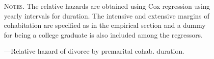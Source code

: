 \documentclass[12pt]{article}
\begin{document}
\begin{figure}[h!]
	\centering
	\caption{---Relative hazard of divorce by premarital cohab. duration.}
	\hspace*{-1.3cm} 
	\label{fig:prec}
	\resizebox{0.8\textwidth}{!}{}
	\begin{minipage}{0.99\textwidth} %
		
		\hspace{30em}
		
		{\scriptsize \textsc{Notes.} The relative hazards are obtained using Cox regression using yearly intervals for duration. The intensive and extensive margins of cohabitation are specified as in the empirical section and a dummy for being a college graduate is also included among the regressors. \par}
	\end{minipage}
\end{figure}
\end{document}
